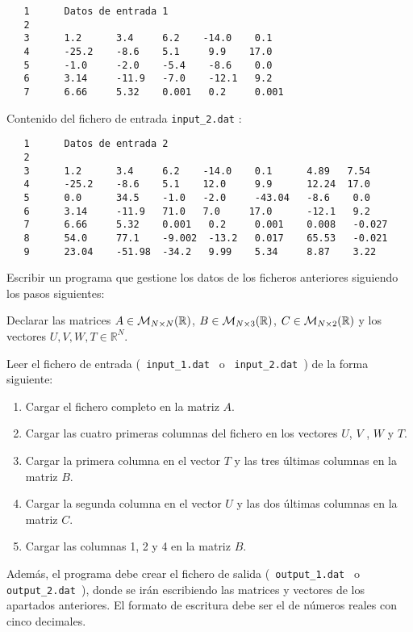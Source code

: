    \begin{verbatim}
   1      Datos de entrada 1
   2
   3      1.2      3.4     6.2    -14.0    0.1
   4      -25.2    -8.6    5.1     9.9    17.0
   5      -1.0     -2.0    -5.4    -8.6    0.0
   6      3.14     -11.9   -7.0    -12.1   9.2
   7      6.66     5.32    0.001   0.2     0.001
   \end{verbatim}
   
   \vspace{1cm}
   
   Contenido del fichero de entrada \verb|input_2.dat| :
   
   \begin{verbatim}
   1      Datos de entrada 2
   2
   3      1.2      3.4     6.2    -14.0    0.1      4.89   7.54
   4      -25.2    -8.6    5.1    12.0     9.9      12.24  17.0
   5      0.0      34.5    -1.0   -2.0     -43.04   -8.6    0.0
   6      3.14     -11.9   71.0   7.0     17.0      -12.1   9.2
   7      6.66     5.32    0.001   0.2     0.001    0.008   -0.027
   8      54.0     77.1    -9.002  -13.2   0.017    65.53   -0.021
   9      23.04    -51.98  -34.2   9.99    5.34     8.87    3.22 
   \end{verbatim}
   
   \vspace{0.5cm}
   
   
   Escribir un programa que gestione los datos de los ficheros anteriores siguiendo los pasos siguientes:
   
   Declarar las matrices $A\in {\cal M}_{N \times N} (\mathbb{R})$,
   $B\in {\cal M}_{N \times 3} (\mathbb{R})$,
   $C\in {\cal M}_{N \times 2} (\mathbb{R})$
   y los vectores $U, V, W, T \in \mathbb{R}^N$.
   
   Leer el fichero de entrada (\verb| input_1.dat | o \verb| input_2.dat |) de la forma siguiente: 
   
   \begin{enumerate}
    \item Cargar el fichero completo en la matriz $A$.
    \item Cargar las cuatro primeras columnas del fichero en los vectores $U$, $V$ , $W$ y $T$. 
    \item Cargar la primera columna en el vector $T$ y las tres \'ultimas columnas en la
    matriz $B$.
    \item Cargar la segunda columna en el vector $U$ y las dos \'ultimas columnas en la
    matriz $C$.
    \item Cargar las columnas 1, 2 y 4 en la matriz $B$.
   \end{enumerate}
   Adem\'as, el programa debe crear el fichero de salida 
   (\verb| output_1.dat | o \verb| output_2.dat |), 
   donde se ir\'an escribiendo las matrices y vectores de los apartados anteriores. 
   El formato de escritura debe ser el de n\'umeros reales con cinco decimales.
   
